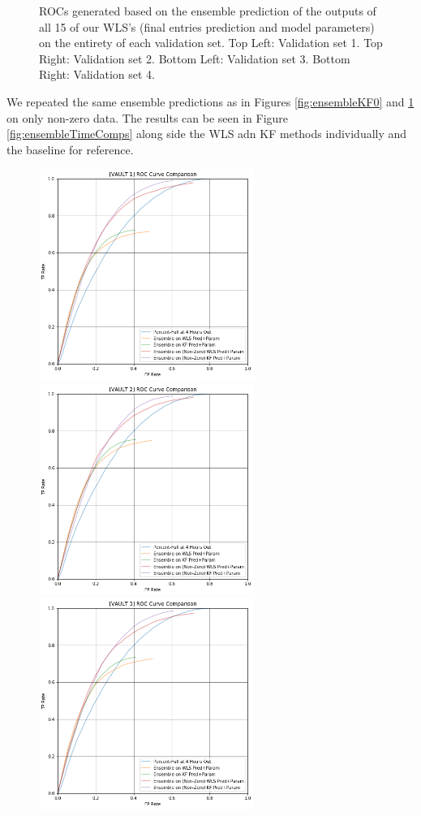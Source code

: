 \begin{figure}[h]
\caption{ROCs generated based on the ensemble prediction of the outputs of all 15 of our WLS's (final entries prediction and model parameters) on the entirety of each validation set. Top Left: Validation set 1. Top Right: Validation set 2. Bottom Left: Validation set 3. Bottom Right: Validation set 4.}
\label{fig:ensembleWLS0}
\end{figure}

We repeated the same ensemble predictions as in Figures \ref{fig:ensembleKF0} and \ref{fig:ensembleWLS0} on only non-zero data. The results can be seen in Figure \ref{fig:ensembleTimeComps} along side the WLS adn KF methods individually and the baseline for reference.

\pagebreak

\begin{figure}[h]
\centering
\includegraphics[width=7cm]{body/results/Graphs/JustSeries/2.PerformanceofEnsemble/3.Compare/v1.png}
\includegraphics[width=7cm]{body/results/Graphs/JustSeries/2.PerformanceofEnsemble/3.Compare/v2.png}
\includegraphics[width=7cm]{body/results/Graphs/JustSeries/2.PerformanceofEnsemble/3.Compare/v3.png}

\end{figure}
